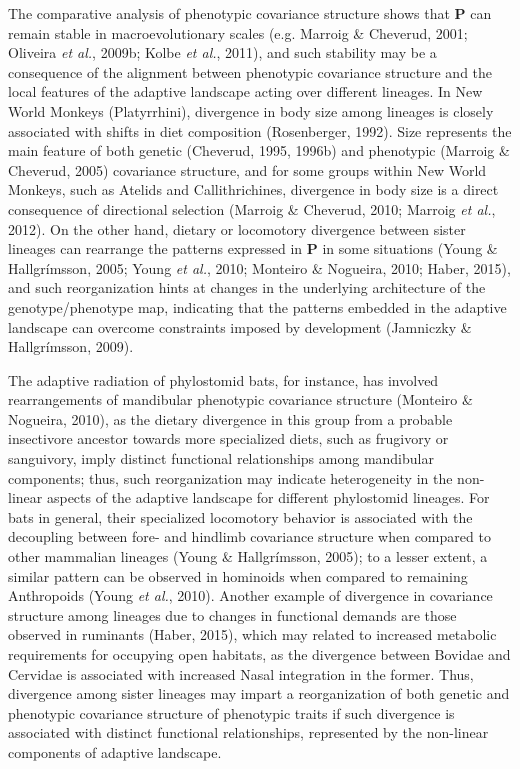 \documentclass[12pt,twoside]{report}
\begin{document}
The comparative analysis of phenotypic covariance structure shows that
$\mathbf{P}$ can remain stable in macroevolutionary scales (e.g. Marroig
\& Cheverud, 2001; Oliveira \emph{et al.}, 2009b; Kolbe \emph{et al.},
2011), and such stability may be a consequence of the alignment between
phenotypic covariance structure and the local features of the adaptive
landscape acting over different lineages. In New World Monkeys
(Platyrrhini), divergence in body size among lineages is closely
associated with shifts in diet composition (Rosenberger, 1992). Size
represents the main feature of both genetic (Cheverud, 1995, 1996b) and
phenotypic (Marroig \& Cheverud, 2005) covariance structure, and for
some groups within New World Monkeys, such as Atelids and
Callithrichines, divergence in body size is a direct consequence of
directional selection (Marroig \& Cheverud, 2010; Marroig \emph{et al.},
2012). On the other hand, dietary or locomotory divergence between
sister lineages can rearrange the patterns expressed in $\mathbf{P}$ in
some situations (Young \& Hallgrímsson, 2005; Young \emph{et al.}, 2010;
Monteiro \& Nogueira, 2010; Haber, 2015), and such reorganization hints
at changes in the underlying architecture of the genotype/phenotype map,
indicating that the patterns embedded in the adaptive landscape can
overcome constraints imposed by development (Jamniczky \& Hallgrímsson,
2009).

The adaptive radiation of phylostomid bats, for instance, has involved
rearrangements of mandibular phenotypic covariance structure (Monteiro
\& Nogueira, 2010), as the dietary divergence in this group from a
probable insectivore ancestor towards more specialized diets, such as
frugivory or sanguivory, imply distinct functional relationships among
mandibular components; thus, such reorganization may indicate
heterogeneity in the non-linear aspects of the adaptive landscape for
different phylostomid lineages. For bats in general, their specialized
locomotory behavior is associated with the decoupling between fore- and
hindlimb covariance structure when compared to other mammalian lineages
(Young \& Hallgrímsson, 2005); to a lesser extent, a similar pattern can
be observed in hominoids when compared to remaining Anthropoids (Young
\emph{et al.}, 2010). Another example of divergence in covariance
structure among lineages due to changes in functional demands are those
observed in ruminants (Haber, 2015), which may related to increased
metabolic requirements for occupying open habitats, as the divergence
between Bovidae and Cervidae is associated with increased Nasal
integration in the former. Thus, divergence among sister lineages may
impart a reorganization of both genetic and phenotypic covariance
structure of phenotypic traits if such divergence is associated with
distinct functional relationships, represented by the non-linear
components of adaptive landscape.
\end{document}
